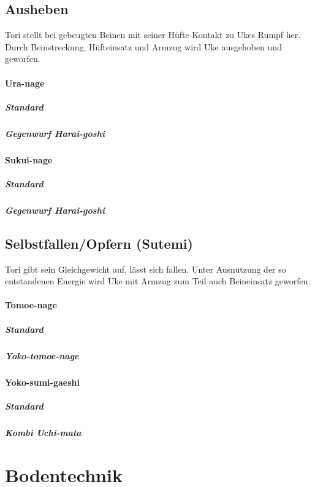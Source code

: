 \documentclass[justified, a4paper, notitlepage, captions=tableheading, nobib]{tufte-handout}
\begin{document}
\subsection{Ausheben }
\label{sec:orge595785}

Tori stellt bei gebeugten Beinen mit seiner Hüfte Kontakt zu Ukes Rumpf her. Durch Beinstreckung,
Hüfteinsatz und Armzug wird Uke ausgehoben und geworfen.

\paragraph{Ura-nage }
\label{sec:orge3e5b5b}

\subparagraph{Standard}
\label{sec:orgc2205bb}

\subparagraph{Gegenwurf Harai-goshi}
\label{sec:org9f97011}

\paragraph{Sukui-nage }
\label{sec:org54aee51}

\subparagraph{Standard}
\label{sec:orge965762}
\subparagraph{Gegenwurf Harai-goshi}
\label{sec:orgef52fb1}

\subsection{Selbstfallen/Opfern (Sutemi) }
\label{sec:org3b357a2}

Tori gibt sein Gleichgewicht auf, lässt sich fallen. Unter Ausnutzung der so entstandenen Energie
wird Uke mit Armzug zum Teil auch Beineinsatz geworfen.

\paragraph{Tomoe-nage }
\label{sec:org281d3e2}

\subparagraph{Standard}
\label{sec:org936073d}
\subparagraph{Yoko-tomoe-nage}
\label{sec:orgbaa908c}

\paragraph{Yoko-sumi-gaeshi }
\label{sec:orgd154e19}

\subparagraph{Standard}
\label{sec:org26bfcdb}
\subparagraph{Kombi Uchi-mata}
\label{sec:org432b36c}

\newpage
\section{Bodentechnik }
\label{sec:org4da884f}
\end{document}
